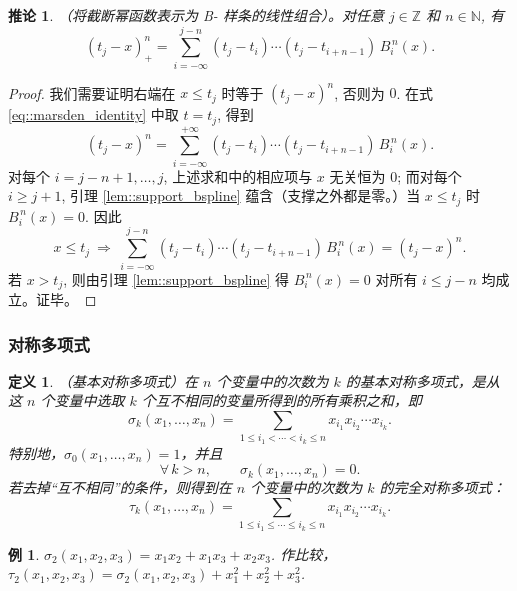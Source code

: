\documentclass[a4paper]{ctexart}
\newtheorem{definition}[theorem]{定义} %
\newtheorem{corollary}[theorem]{推论}
\newtheorem{example}[theorem]{例}
\numberwithin{theorem}{section}
\numberwithin{equation}{section}
\numberwithin{figure}{section}
\numberwithin{remark}{section}
\begin{document}
\begin{corollary}
    \label{cor::truncated_as_linear_comb_bspline}
（将截断幂函数表示为 B- 样条的线性组合）。对任意 $j\in\mathbb{Z}$ 和 $n\in\mathbb{N}$, 有
\begin{equation}
\label{eq::truncated_linear_combo}
(t_j-x)^{n}_{+}=\sum_{i=-\infty}^{j-n}(t_j-t_i)\cdots (t_j-t_{i+n-1})\,B^{\,n}_i(x).
\end{equation}
\end{corollary}

\begin{proof}
我们需要证明右端在 $x\le t_j$ 时等于 $(t_j-x)^n$, 否则为 $0$. 在式 \eqref{eq::marsden_identity} 中取 $t=t_j$, 得到
\[
(t_j-x)^n=\sum_{i=-\infty}^{+\infty}(t_j-t_i)\cdots (t_j-t_{i+n-1})\,B^{\,n}_i(x).
\]
对每个 $i=j-n+1,\ldots,j$, 上述求和中的相应项与 $x$ 无关恒为 $0$; 而对每个 $i\ge j+1$, 引理 \ref{lem::support_bspline} 蕴含（支撑之外都是零。）当 $x\le t_j$ 时 $B^{\,n}_i(x)=0$. 因此
\[
x\le t_j\ \Longrightarrow\ \sum_{i=-\infty}^{j-n}(t_j-t_i)\cdots (t_j-t_{i+n-1})\,B^{\,n}_i(x)=(t_j-x)^n.
\]
若 $x>t_j$, 则由引理 \ref{lem::support_bspline} 得 $B^{\,n}_i(x)=0$ 对所有 $i\le j-n$ 均成立。证毕。
\end{proof}

\subsubsection{对称多项式}
\label{subsubsec::symmetric_polynomials}

\begin{definition}
    \label{def::elementary_symmetric_poly}
（基本对称多项式）在 $n$ 个变量中的次数为 $k$ 的基本对称多项式，是从这 $n$ 个变量中选取 $k$ 个互不相同的变量所得到的所有乘积之和，即
\begin{equation}
\label{eq::elem_sym_def}
\sigma_k(x_1,\ldots,x_n)=
\sum_{1\le i_1<\cdots<i_k\le n} x_{i_1}x_{i_2}\cdots x_{i_k}.
\end{equation}
特别地，$\sigma_0(x_1,\ldots,x_n)=1$，并且
\[
\forall\,k>n,\qquad \sigma_k(x_1,\ldots,x_n)=0.
\]
若去掉“互不相同”的条件，则得到在 $n$ 个变量中的次数为 $k$ 的完全对称多项式：
\begin{equation}
\label{eq::complete_sym_def}
\tau_k(x_1,\ldots,x_n)=
\sum_{1\le i_1\le\cdots\le i_k\le n} x_{i_1}x_{i_2}\cdots x_{i_k}.
\end{equation}
\end{definition}

\begin{example}
    \label{ex::elem_sym_239}
$\sigma_2(x_1,x_2,x_3)=x_1x_2+x_1x_3+x_2x_3$. 作比较，$\tau_2(x_1,x_2,x_3)=\sigma_2(x_1,x_2,x_3)+x_1^2+x_2^2+x_3^2$.
\end{example}
\end{document}

